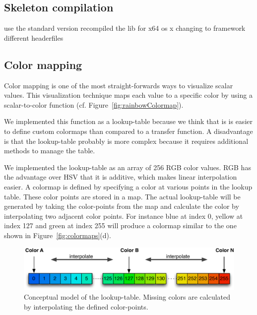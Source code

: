 \subsection{Skeleton compilation}

use the standard version
recompiled the lib for x64 os x 
changing to framework 
different headerfiles

\subsection{Color mapping}
Color mapping is one of the most straight-forwards ways to visualize scalar values. This visualization technique maps each value to a specific color by using a scalar-to-color function (cf. Figure~\ref{fig:rainbowColormap}). 

We implemented this function as a lookup-table because we think that is is easier to define custom colormaps than compared to a transfer function. A disadvantage is that the lookup-table probably is more complex because it requires additional methods to manage the table.

We implemented the lookup-table as an array of 256 RGB color values. RGB has the advantage over HSV that it is additive, which makes linear interpolation easier. A colormap is defined by specifying a color at various points in the lookup table. These color points are stored in a map. The actual lookup-table will be generated by taking the color-points from the map and calculate the color by interpolating two adjacent color points. For instance blue at index 0, yellow at index 127 and green at index 255 will produce a colormap similar to the one shown in Figure~\ref{fig:colormaps}(d). 


\begin{figure}[htbp]
    \centering
    \includegraphics[width=.8\textwidth]{figures/colormaps/lookuptable.pdf}
    \caption{Conceptual model of the lookup-table. Missing colors are calculated by interpolating the defined color-points.}
    \label{fig:lookupTable}
\end{figure}

